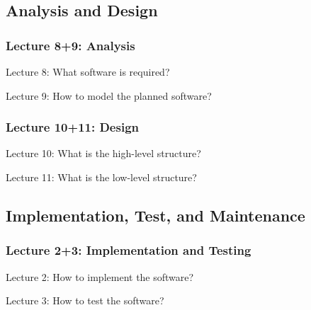 \subsection{Analysis and Design}
\subsubsection{Lecture 8+9: Analysis}
\begin{frame}[1]{Lecture 8: What software is required?}
	\slideMindmapNonFunctionalRequirements
\end{frame}
\begin{frame}{Lecture 9: How to model the planned software?}
	\centering\slideMindmapUMLdiagrams{}{}{}{}{}{}{}{}{}
\end{frame}

\subsubsection{Lecture 10+11: Design}
\begin{frame}{Lecture 10: What is the high-level structure?}
	\begin{fancycolumns}[animation=none]
	\nextcolumn
	\end{fancycolumns}
\end{frame}
\begin{frame}{Lecture 11: What is the low-level structure?}
	\begin{fancycolumns}[animation=none]
	\nextcolumn
	\end{fancycolumns}
\end{frame}

\subsection{Implementation, Test, and Maintenance}

\subsubsection{Lecture 2+3: Implementation and Testing}
\begin{frame}[2]{Lecture 2: How to implement the software?}
\end{frame}
\begin{frame}{Lecture 3: How to test the software?}
	\slideMindmapQualityAssurance{}{}{}{}{}{}{}
\end{frame}


